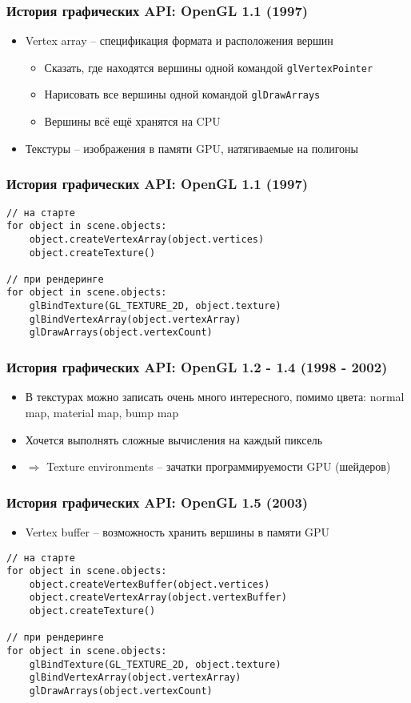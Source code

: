 \documentclass{beamer}
\begin{document}
\begin{frame}[fragile]
\frametitle{История графических API: OpenGL 1.1 (1997)}
\begin{itemize}
\item Vertex array -- спецификация формата и расположения вершин
\begin{itemize}
\item Сказать, где находятся вершины одной командой \verb|glVertexPointer|
\item Нарисовать все вершины одной командой \verb|glDrawArrays|
\item Вершины всё ещё хранятся на CPU
\end{itemize}
\pause
\item Текстуры -- изображения в памяти GPU, натягиваемые на полигоны
\end{itemize}
\end{frame}

\begin{frame}[fragile]
\frametitle{История графических API: OpenGL 1.1 (1997)}
\begin{verbatim}
// на старте
for object in scene.objects:
    object.createVertexArray(object.vertices)
    object.createTexture()

// при рендеринге
for object in scene.objects:
    glBindTexture(GL_TEXTURE_2D, object.texture)
    glBindVertexArray(object.vertexArray)
    glDrawArrays(object.vertexCount)
\end{verbatim}
\end{frame}

\begin{frame}
\frametitle{История графических API: OpenGL 1.2 - 1.4 (1998 - 2002)}
\begin{itemize}
\item В текстурах можно записать очень много интересного, помимо цвета: normal map, material map, bump map
\item Хочется выполнять сложные вычисления на каждый пиксель
\pause
\item $\Longrightarrow$ Texture environments -- зачатки программируемости GPU (шейдеров)
\end{itemize}
\end{frame}

\begin{frame}[fragile]
\frametitle{История графических API: OpenGL 1.5 (2003)}
\begin{itemize}
\item Vertex buffer -- возможность хранить вершины в памяти GPU
\end{itemize}
\pause
\begin{verbatim}
// на старте
for object in scene.objects:
    object.createVertexBuffer(object.vertices)
    object.createVertexArray(object.vertexBuffer)
    object.createTexture()

// при рендеринге
for object in scene.objects:
    glBindTexture(GL_TEXTURE_2D, object.texture)
    glBindVertexArray(object.vertexArray)
    glDrawArrays(object.vertexCount)
\end{verbatim}
\end{frame}
\end{document}
